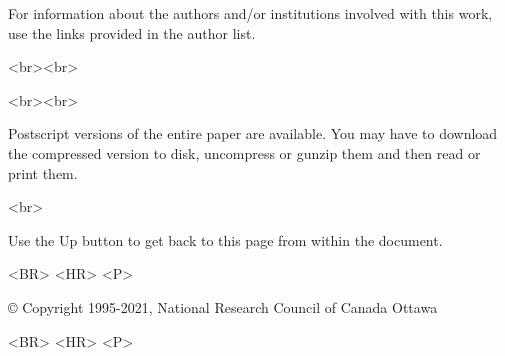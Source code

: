 \documentclass[12pt,twoside]{article}      %
\begin{document}
\begin{htmlonly}
For information about the authors and/or institutions involved with this
work, use the links provided in the author list.\\
\begin{rawhtml}
<br><br>
\end{rawhtml}

\begin{rawhtml}
<br><br>
\end{rawhtml}

Postscript versions of the entire paper are available.  You may have to
download the compressed version to disk, uncompress or gunzip them and
then read or print them.
\begin{rawhtml}
<br>
\end{rawhtml}

Use the Up button to get back to this page from within the document.
\begin{rawhtml}
<BR> <HR> <P>
\end{rawhtml}
\copyright
Copyright 1995-2021, National Research Council of Canada
Ottawa
\begin{rawhtml}
<BR> <HR> <P>
\end{rawhtml}
\end{htmlonly}

\pagestyle{empty}

\vspace*{-2cm}
\end{document}
